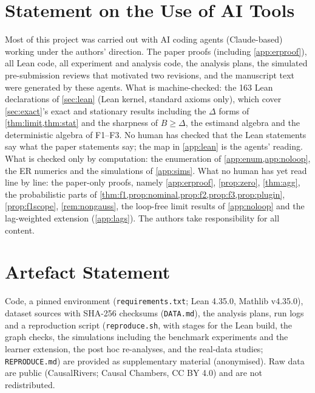 \documentclass{article}
\theoremstyle{plain}
\theoremstyle{definition}
\theoremstyle{remark}
\begin{document}
\section*{Statement on the Use of AI Tools}
Most of this project was carried out with AI coding agents (Claude-based)
working under the authors' direction. The paper proofs (including
\cref{app:erproof}), all Lean code, all experiment and analysis code, the
analysis plans, the simulated pre-submission reviews that motivated two
revisions, and the manuscript text were generated by these agents. What is
machine-checked: the 163 Lean declarations of \cref{sec:lean} (Lean kernel,
standard axioms only), which cover \cref{sec:exact}'s exact and stationary
results including the $\Delta$ forms of \cref{thm:limit,thm:stat} and the
sharpness of $B\ge\Delta$, the estimand algebra and the deterministic algebra of
F1--F3. No human has checked that the Lean statements say what the paper
statements say; the map in \cref{app:lean} is the agents' reading. What is
checked only by computation: the enumeration of \cref{app:enum,app:noloop},
the ER numerics and the simulations of \cref{app:sims}. What no human has yet
read line by line: the paper-only proofs, namely \cref{app:erproof},
\cref{prop:zero}, \cref{thm:agg}, the probabilistic parts of
\cref{thm:f1,prop:nominal,prop:f2,prop:f3,prop:plugin}, \cref{prop:f1scope},
\cref{rem:nongauss}, the loop-free limit results of \cref{app:noloop} and the
lag-weighted extension (\cref{app:lags}). The authors take responsibility for
all content.

\section*{Artefact Statement}
Code, a pinned environment (\texttt{requirements.txt}; Lean 4.35.0, Mathlib
v4.35.0), dataset sources with SHA-256 checksums (\texttt{DATA.md}), the
analysis plans, run logs and a reproduction script (\texttt{reproduce.sh},
with stages for the Lean build, the graph checks, the simulations including
the benchmark experiments and the learner extension, the post hoc
re-analyses, and the real-data studies; \texttt{REPRODUCE.md}) are provided as
supplementary material (anonymised). Raw data are public (CausalRivers; Causal
Chambers, CC BY 4.0) and are not redistributed.




\newpage
\appendix
\onecolumn

\end{document}
